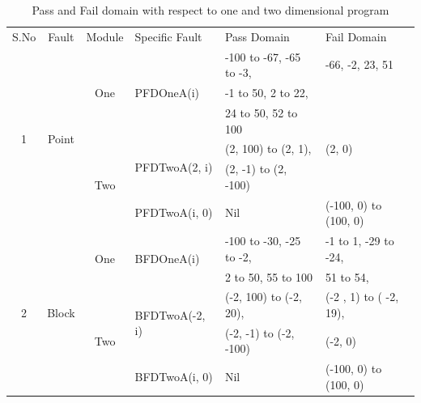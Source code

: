\begin{table}[h]
\centering
\caption{Pass and Fail domain with respect to one and two dimensional program}
\scriptsize

\begin{tabular}{|c|c|c|l|l|l|}

\hline 


\multirow{2}{*}{S.No}	& \multirow{2}{*}{Fault }	 				& \multirow{2}{*}{Module} 		& \multirow{2}{*}{Specific Fault}	 		& \multirow{2}{*}{Pass Domain} 					& \multirow{2}{*}{Fail Domain} 			\\  
					& Domain								&  Dimension					&									&											&								\\ \hline 
\multirow{6}{*}{1} 	&	\multirow{6}{*}{Point}				& 	\multirow{3}{*}{One}			&	\multirow{3}{*}{PFDOneA(i)}	&	-100 to -67, -65 to -3, 		  		& -66, -2, 23, 51			 	\\  
				&									&							&							&	-1 to 50, 2 to 22, 					&							\\  
				&									&							&							&	24 to 50, 52 to 100					&							\\ \cline{3-6}
				&									&	\multirow{3}{*}{Two}			&	\multirow{2}{*}{PFDTwoA(2, i)}	&	(2, 100) to (2, 1),	 				&  (2, 0)						\\  
				&									&							&							&	(2, -1) to (2, -100)					&							\\ \cline{4-6}
				&									& 							&	PFDTwoA(i, 0)				&	Nil								& (-100, 0) to (100, 0)				\\  \hline



\multirow{5}{*}{2} 	&	\multirow{5}{*}{Block}				& 	\multirow{2}{*}{One}			&	\multirow{2}{*}{BFDOneA(i)}	&	-100 to -30, -25 to -2, 					& 	-1 to 1, -29 to -24,		 	\\ 
				&									&							&							&	2 to 50, 55 to 100						&	51 to 54,				\\   \cline{3-6}
				&									&	\multirow{3}{*}{Two}			&	\multirow{2}{*}{BFDTwoA(-2, i)}	&	(-2, 100) to (-2, 20), 					& 	(-2 , 1) to ( -2, 19), 		\\ 
				&									&							&							&      (-2, -1) to (-2, -100)					&	(-2, 0)				\\ \cline{4-6}
				&									& 							&	BFDTwoA(i, 0)				&	Nil								& 	(-100, 0) to (100, 0)		\\  \hline
				
				




\end{tabular}
\end{table}
